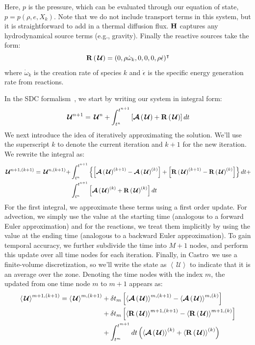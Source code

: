 \documentclass[a4paper]{jpconf}
\newcommand{\castro}{{\sffamily Castro}}
\newcommand{\Uc}{{\,\bm{\mathcal{U}}}}
\newcommand{\Advs}[1]{\boldsymbol{\mathcal{A}} \left(#1\right)}
\newcommand{\omegadot}{\dot{\omega}}
\newcommand{\avg}[1]{{\left \langle #1 \right \rangle}}
\newcommand{\Rbs}[1]{{\bf R} \left ( #1 \right )}
\begin{document}
Here, $p$ is the pressure, which can be evaluated through our equation
of state, $p = p(\rho, e, X_k)$.  Note that we do not include
transport terms in this system, but it is straightforward to add in a
thermal diffusion flux.  ${\bf H}$ captures any hydrodynamical source
terms (e.g., gravity).  Finally the reactive sources take the form:
\begin{equation}
\Rbs{\Uc} = (0, \rho \omegadot_k, 0, 0, 0, \rho \dot{\epsilon})^\intercal
\end{equation}
where $\omegadot_k$ is the creation rate of species $k$ and $\dot{\epsilon}$
is the specific energy generation rate from reactions.

In the SDC formalism~\cite{dutt:2000,minion:2003}, we start by writing our system in integral form:
\begin{equation}
\Uc^{n+1} = \Uc^n + \int_{t^n}^{t^{n+1}} \left [\Advs{\Uc} + \Rbs{\Uc} \right ] dt
\end{equation}
We next introduce the idea of iteratively approximating the solution.
We'll use the superscript $k$ to denote the current iteration and
$k+1$ for the new iteration.  We rewrite the integral as:
\begin{align}
\Uc^{n+1,(k+1)} = \Uc^{n,(k+1)} +
   &\int_{t^n}^{t^{n+1}} \left \{ \left [ \Advs{\Uc}^{(k+1)} - \Advs{\Uc}^{(k)} \right ]
   + \left [ \Rbs{\Uc}^{(k+1)} - \Rbs{\Uc}^{(k)} \right ] \right \} dt + \nonumber \\
  & \int_{t^n}^{t^{n+1}} \left [\Advs{\Uc}^{(k)} + \Rbs{\Uc}^{(k)} \right ] dt
\end{align}
For the first integral, we approximate these terms using a first order
update.  For advection, we simply use the value at the starting time
(analogous to a forward Euler approximation) and for the reactions, we
treat them implicitly by using the value at the ending time (analogous
to a backward Euler approximation).  To gain temporal accuracy, we
further subdivide the time into $M+1$ nodes, and perform this update
over all time nodes for each iteration.  Finally, in \castro\ we use a finite-volume
discretization, so we'll write the state as $\avg{\Uc}$ to indicate that it is an average over the zone.
Denoting the time nodes with
the index $m$, the updated from one time node $m$ to $m+1$ appears as:
    \begin{align}
      \label{eq:sdc:general}
      \avg{\Uc}^{{m+1},(k+1)} = \avg{\Uc}^{m,(k+1)}
            &+ \delta t_m \left [ \avg{\Advs{\Uc}}^{m,(k+1)} - \avg{\Advs{\Uc}}^{m,(k)} \right ] \nonumber \\
            &+ \delta t_m \left [ \avg{\Rbs{\Uc}}^{{m+1},(k+1)} - \avg{\Rbs{\Uc}}^{{m+1},(k)} \right ] \nonumber \\
            &+ \int_{t^m}^{t^{m+1}} dt  \left (\avg{\Advs{\Uc}}^{(k)} + \avg{\Rbs{\Uc}}^{(k)}\right)
   \end{align}
\end{document}
